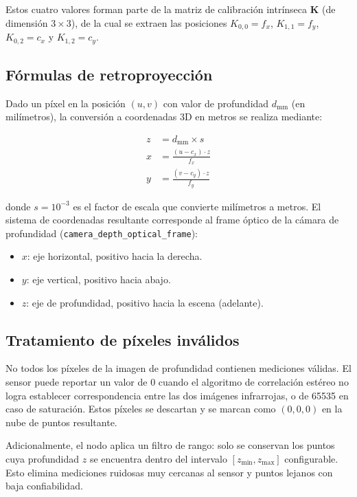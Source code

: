 Estos cuatro valores forman parte de la matriz de calibración intrínseca
$\mathbf{K}$ (de dimensión $3 \times 3$), de la cual se extraen las
posiciones $K_{0,0} = f_x$, $K_{1,1} = f_y$, $K_{0,2} = c_x$ y
$K_{1,2} = c_y$.

\subsection{Fórmulas de retroproyección}

Dado un píxel en la posición $(u, v)$ con valor de profundidad
$d_{\text{mm}}$ (en milímetros), la conversión a coordenadas 3D en metros
se realiza mediante:

\begin{align}
  z &= d_{\text{mm}} \times s \label{eq:depth-z} \\
  x &= \frac{(u - c_x) \cdot z}{f_x} \label{eq:depth-x} \\
  y &= \frac{(v - c_y) \cdot z}{f_y} \label{eq:depth-y}
\end{align}

\noindent donde $s = 10^{-3}$ es el factor de escala que convierte
milímetros a metros. El sistema de coordenadas resultante corresponde al
frame óptico de la cámara de profundidad
(\texttt{camera\_depth\_optical\_frame}):

\begin{itemize}
  \item $x$: eje horizontal, positivo hacia la derecha.
  \item $y$: eje vertical, positivo hacia abajo.
  \item $z$: eje de profundidad, positivo hacia la escena (adelante).
\end{itemize}

\subsection{Tratamiento de píxeles inválidos}

No todos los píxeles de la imagen de profundidad contienen mediciones
válidas. El sensor puede reportar un valor de 0 cuando el algoritmo de
correlación estéreo no logra establecer correspondencia entre las dos
imágenes infrarrojas, o de 65535 en caso de saturación. Estos píxeles
se descartan y se marcan como $(0, 0, 0)$ en la nube de puntos resultante.

Adicionalmente, el nodo aplica un filtro de rango: solo se conservan los
puntos cuya profundidad $z$ se encuentra dentro del intervalo
$[z_{\min}, z_{\max}]$ configurable. Esto elimina mediciones ruidosas
muy cercanas al sensor y puntos lejanos con baja confiabilidad.

